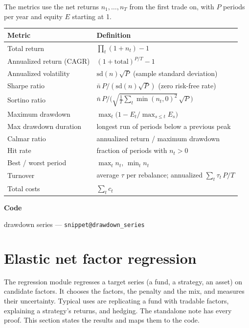 \documentclass[11pt,a4paper]{article}
\makeatletter
\newcommand{\snippetsource}[1]{\csname snippet@#1\endcsname}
\newcommand{\snippet}[3]{%
  }
\newenvironment{codepointers}{%
  \par\smallskip\begingroup\footnotesize\noindent\textcolor{blue!50!black}{\textbf{Code}}\par\nopagebreak
  \begin{list}{}{\setlength{\leftmargin}{1.2em}\setlength{\itemsep}{0pt}\setlength{\parsep}{0pt}\setlength{\topsep}{1pt}}}%
  {\end{list}\endgroup\smallskip}
\newcommand{\codeitem}[2]{\item #2 --- \texttt{\snippetsource{#1}}}
\makeatother
\begin{document}
The metrics use the net returns $n_1,\dots,n_T$ from the first trade on, with $P$ periods
per year and equity $E$ starting at 1.
\begin{center}\small
\begin{tabular}{@{}ll@{}}
\toprule
Metric & Definition \\
\midrule
Total return & $\prod_t(1+n_t)-1$ \\
Annualized return (CAGR) & $(1+\text{total})^{P/T}-1$ \\
Annualized volatility & $\mathrm{sd}(n)\sqrt P$ (sample standard deviation) \\
Sharpe ratio & $\bar n\,P/(\mathrm{sd}(n)\sqrt P)$ (zero risk-free rate) \\
Sortino ratio & $\bar n\,P/\big(\sqrt{\tfrac1T\sum_t\min(n_t,0)^2}\,\sqrt P\big)$ \\
Maximum drawdown & $\max_t\big(1-E_t/\max_{s\le t}E_s\big)$ \\
Max drawdown duration & longest run of periods below a previous peak \\
Calmar ratio & annualized return / maximum drawdown \\
Hit rate & fraction of periods with $n_t>0$ \\
Best / worst period & $\max_tn_t$, $\min_tn_t$ \\
Turnover & average $\tau$ per rebalance; annualized $\sum_t\tau_t\,P/T$ \\
Total costs & $\sum_tc_t$ \\
\bottomrule
\end{tabular}
\end{center}
\snippet{performance}{C++}{Performance metrics}
\begin{codepointers}
  \codeitem{drawdown_series}{drawdown series}
\end{codepointers}

\section{Elastic net factor regression}\label{sec:regression}

The regression module regresses a target series (a fund, a strategy, an asset) on candidate
factors. It chooses the factors, the penalty and the mix, and measures their uncertainty.
Typical uses are replicating a fund with tradable factors, explaining a strategy's returns,
and hedging. The standalone note  has every
proof. This section states the results and maps them to the code.
\end{document}
